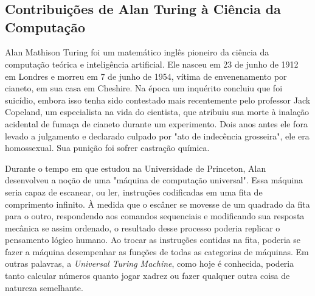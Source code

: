 \documentclass[
  12pt,     %
  openright,      %
  oneside,      %
  a4paper,      %
  english,      %
  brazil        %
  ]{abntex2}
\begin{document}

\frenchspacing


\imprimircapa

\imprimirfolhaderosto

\tableofcontents*
\cleardoublepage

\textual

\chapter*{}
\section*{Contribuições de Alan Turing à Ciência da Computação}

Alan Mathison Turing foi um matemático inglês pioneiro da ciência da computação teórica e inteligência artificial. Ele nasceu em 23 de junho de 1912 em Londres e morreu em 7 de junho de 1954, vítima de envenenamento por cianeto, em sua casa em Cheshire. Na época um inquérito concluiu que foi suicídio, embora isso tenha sido contestado mais recentemente pelo professor Jack Copeland, um especialista na vida do cientista, que atribuiu sua morte à inalação acidental de fumaça de cianeto durante um experimento. Dois anos antes ele fora levado a julgamento e declarado culpado por "ato de indecência grosseira", ele era homossexual. Sua punição foi sofrer castração química.

Durante o tempo em que estudou na Universidade de Princeton, Alan desenvolveu a noção de uma "máquina de computação universal". Essa máquina seria capaz de escanear, ou ler, instruções codificadas em uma fita de comprimento infinito. À medida que o escâner se movesse de um quadrado da fita para o outro, respondendo aos comandos sequenciais e modificando sua resposta mecânica se assim ordenado, o resultado desse processo poderia replicar o pensamento lógico humano. Ao trocar as instruções contidas na fita, poderia se fazer a máquina desempenhar as funções de todas as categorias de máquinas. Em outras palavras, a \textit{Universal Turing Machine}, como hoje é conhecida, poderia tanto calcular números quanto jogar xadrez ou fazer qualquer outra coisa de natureza semelhante.
\end{document}

